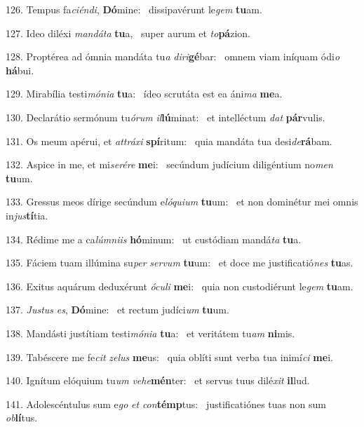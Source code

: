126. Tempus fa\textit{ci}\textit{én}\textit{di}, \textbf{Dó}mine: \ast\  dissipavérunt le\textit{gem} \textbf{tu}am.\

127. Ideo diléxi \textit{man}\textit{dá}\textit{ta} \textbf{tu}a, \ast\  super aurum et \textit{to}\textbf{pá}zion.\

128. Proptérea ad ómnia mandáta tu\textit{a} \textit{di}\textit{ri}\textbf{gé}bar: \ast\  omnem viam iníquam ódi\textit{o} \textbf{há}bui.\

129. Mirabília testi\textit{mó}\textit{ni}\textit{a} \textbf{tu}a: \ast\  ídeo scrutáta est ea áni\textit{ma} \textbf{me}a.\

130. Declarátio sermónum tu\textit{ó}\textit{rum} \textit{il}\textbf{lú}minat: \ast\  et intelléctum \textit{dat} \textbf{pár}vulis.\

131. Os meum apérui, et \textit{at}\textit{trá}\textit{xi} \textbf{spí}ritum: \ast\  quia mandáta tua desi\textit{de}\textbf{rá}bam.\

132. Aspice in me, et mi\textit{se}\textit{ré}\textit{re} \textbf{me}i: \ast\  secúndum judícium diligéntium no\textit{men} \textbf{tu}um.\

133. Gressus meos dírige secúndum e\textit{ló}\textit{qui}\textit{um} \textbf{tu}um: \ast\  et non dominétur mei omnis in\textit{jus}\textbf{tí}tia.\

134. Rédime me a ca\textit{lúm}\textit{ni}\textit{is} \textbf{hó}minum: \ast\  ut custódiam mandá\textit{ta} \textbf{tu}a.\

135. Fáciem tuam illúmina su\textit{per} \textit{ser}\textit{vum} \textbf{tu}um: \ast\  et doce me justificatió\textit{nes} \textbf{tu}as.\

136. Exitus aquárum deduxérunt \textit{ó}\textit{cu}\textit{li} \textbf{me}i: \ast\  quia non custodiérunt le\textit{gem} \textbf{tu}am.\

137. \textit{Jus}\textit{tus} \textit{es}, \textbf{Dó}mine: \ast\  et rectum judíci\textit{um} \textbf{tu}um.\

138. Mandásti justítiam testi\textit{mó}\textit{ni}\textit{a} \textbf{tu}a: \ast\  et veritátem tu\textit{am} \textbf{ni}mis.\

139. Tabéscere me fe\textit{cit} \textit{ze}\textit{lus} \textbf{me}us: \ast\  quia oblíti sunt verba tua inimí\textit{ci} \textbf{me}i.\

140. Ignítum elóquium tu\textit{um} \textit{ve}\textit{he}\textbf{mén}ter: \ast\  et servus tuus dilé\textit{xit} \textbf{il}lud.\

141. Adolescéntulus sum e\textit{go} \textit{et} \textit{con}\textbf{témp}tus: \ast\  justificatiónes tuas non sum \textit{ob}\textbf{lí}tus.\

